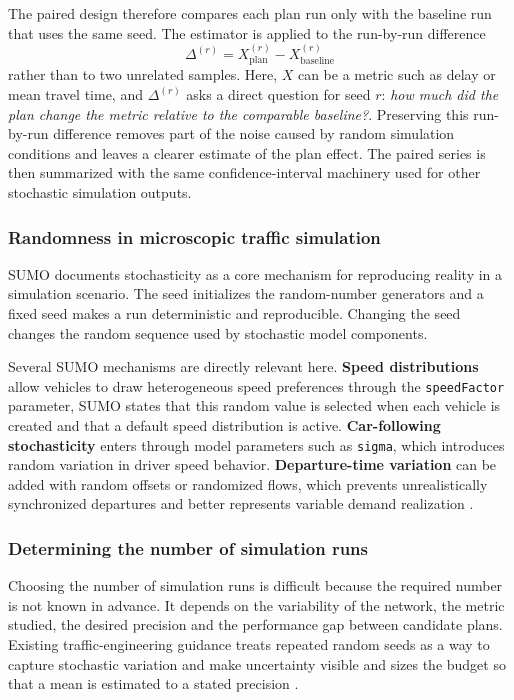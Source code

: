 The paired design therefore compares each plan run only with the baseline run that uses the same
seed. The estimator is applied to the run-by-run difference
\[
  \Delta^{(r)} = X_{\text{plan}}^{(r)} - X_{\text{baseline}}^{(r)}
\]
rather than to two unrelated samples. Here, $X$ can be a metric such as delay or mean travel time,
and $\Delta^{(r)}$ asks a direct question for seed $r$: \emph{how much did the plan change the metric
relative to the comparable baseline?}. Preserving this run-by-run difference removes part of the
noise caused by random simulation conditions and leaves a clearer estimate of the plan effect. The
paired series is then summarized with the same confidence-interval machinery used for other
stochastic simulation outputs.

\subsubsection{Randomness in microscopic traffic simulation}

SUMO documents stochasticity as a core mechanism for reproducing reality in a simulation scenario.
The seed initializes the random-number generators and a fixed seed makes a run deterministic and
reproducible. Changing the seed changes the random sequence used by stochastic model components.

Several SUMO mechanisms are directly relevant here. \textbf{Speed distributions} allow vehicles to
draw heterogeneous speed preferences through the \texttt{speedFactor} parameter, SUMO states that
this random value is selected when each vehicle is created and that a default speed distribution is
active.
\textbf{Car-following stochasticity} enters through model parameters such as
\texttt{sigma}, which introduces random variation in driver speed behavior.
\textbf{Departure-time variation} can be added with random offsets or randomized flows, which
prevents unrealistically synchronized departures and better represents variable demand realization
\cite{sumo_randomness}.

\subsubsection{Determining the number of simulation runs}

Choosing the number of simulation runs is difficult because the required number is not known in
advance. It depends on the variability of the network, the metric studied, the desired precision
and the performance gap between candidate plans. Existing traffic-engineering guidance treats
repeated random seeds as a way to capture stochastic variation and make uncertainty visible and
sizes the budget so that a mean is estimated to a stated precision
\cite{number_of_runs_traffic,fhwa_microsim_2019,txdot_number_runs}.

